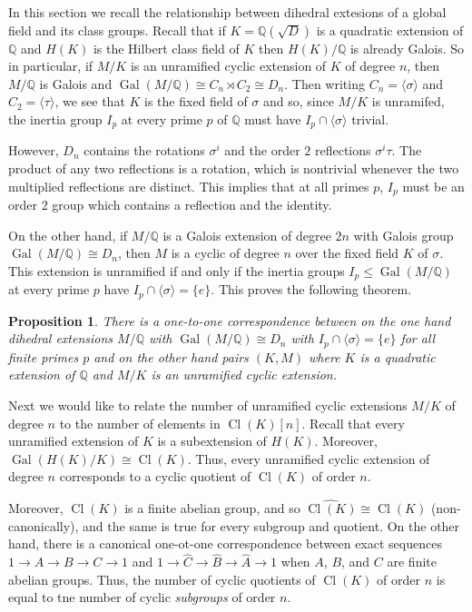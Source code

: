 \documentclass[11pt]{article}
\newcommand{\Cl}{\operatorname{Cl}}
\newcommand{\Gal}{\operatorname{Gal}}
\newcommand{\Q}{\mathbb{Q}}
\newtheorem{prop}[lem]{Proposition}
\theoremstyle{definition}
\begin{document}
In this section we recall the relationship between dihedral extesions of a
global field and its class groups. Recall that if $K = \Q(\sqrt{D})$ is a
quadratic extension of $\Q$ and $H(K)$ is the Hilbert class field of $K$ then
$H(K)/\Q$ is already Galois. So in particular, if $M/K$ is an unramified cyclic
extension of $K$ of degree $n$, then $M/\Q$ is Galois and $\Gal(M/\Q) \cong C_n
\rtimes C_2 \cong D_n$.  Then writing $C_n = \langle \sigma \rangle$ and $C_2 =
\langle \tau \rangle$, we see that $K$ is the fixed field of $\sigma$ and so,
since $M/K$ is unramifed, the inertia group $I_p$ at every prime $p$ of $\Q$
must have $I_p \cap \langle \sigma \rangle$ trivial.

However, $D_n$ contains the rotations $\sigma^i$ and the order $2$ reflections
$\sigma^i\tau$.  The product of any two reflections is a rotation, which is
nontrivial whenever the two multiplied reflections are distinct. This implies
that at all primes $p$, $I_p$ must be an order $2$ group which contains a
reflection and the identity.

On the other hand, if $M/\Q$ is a Galois extension of degree $2n$ with Galois
group $\Gal(M/\Q) \cong D_n$, then $M$ is a cyclic of degree $n$ over the fixed
field $K$ of $\sigma$.  This extension is unramified if and only if the inertia
groups $I_p \leq \Gal(M/\Q)$ at every prime $p$ have $I_p \cap \langle \sigma
\rangle = \{ e \}$. This proves the following theorem.

\begin{prop}
  There is a one-to-one correspondence between on the one hand dihedral
extensions $M/\Q$ with $\Gal(M/\Q) \cong D_n$ with $I_p \cap \langle \sigma
\rangle = \{ e \}$ for all finite primes $p$ and on the other hand pairs $(K,
M)$ where $K$ is a quadratic extension of $\Q$ and $M/K$ is an unramified
cyclic extension.
\end{prop}

Next we would like to relate the number of unramified cyclic extensions $M/K$
of degree $n$ to the number of elements in $\Cl(K)[n]$. Recall that every
unramified extension of $K$ is a subextension of $H(K)$. Moreover,
$\Gal(H(K)/K) \cong \Cl(K)$. Thus, every unramified cyclic extension of degree
$n$ corresponds to a cyclic quotient of $\Cl(K)$ of order $n$.

Moreover, $\Cl(K)$ is a finite abelian group, and so $\widehat{\Cl(K)} \cong
\Cl(K)$ (non-canonically), and the same is true for every subgroup and
quotient. On the other hand, there is a canonical one-ot-one correspondence
between exact sequences $1 \to A \to B \to C \to 1$ and $1 \to \hat{C} \to
\hat{B} \to \hat{A} \to 1$ when $A$, $B$, and $C$ are finite abelian groups.
Thus, the number of cyclic quotients of $\Cl(K)$ of order $n$ is equal to tne
number of cyclic {\em subgroups} of order $n$.
\end{document}
